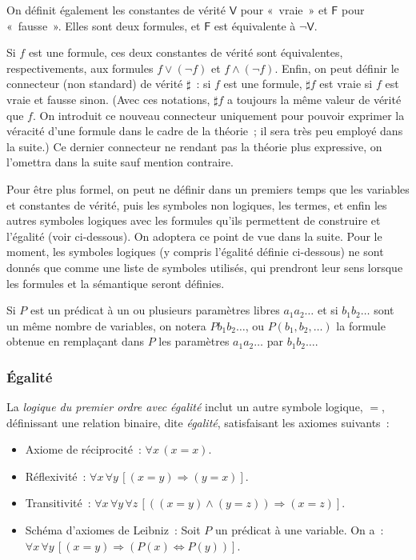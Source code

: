 On définit également les constantes de vérité $\mathsf{V}$ pour « vraie » et $\mathsf{F}$ pour « fausse ». 
Elles sont deux formules, et $\mathsf{F}$ est équivalente à $\neg \mathsf{V}$.

Si $f$ est une formule, ces deux constantes de vérité sont équivalentes, respectivements, aux formules $f \vee (\neg f)$ et $f \wedge (\neg f)$. 
Enfin, on peut définir le connecteur (non standard) de vérité $\sharp$ : si $f$ est une formule, $\sharp f$ est vraie si $f$ est vraie et fausse sinon.\sindex[isy]{$\sharp$} 
(Avec ces notations, $\sharp f$ a toujours la même valeur de vérité que $f$. 
On introduit ce nouveau connecteur uniquement pour pouvoir exprimer la véracité d'une formule dans le cadre de la théorie ; il sera très peu employé dans la suite.)
Ce dernier connecteur ne rendant pas la théorie plus expressive, on l'omettra dans la suite sauf mention contraire.

Pour être plus formel, on peut ne définir dans un premiers temps que les variables et constantes de vérité, puis les symboles non logiques, les termes, et enfin les autres symboles logiques avec les formules qu'ils permettent de construire et l'égalité (voir ci-dessous). 
On adoptera ce point de vue dans la suite. 
Pour le moment, les symboles logiques (y compris l'égalité définie ci-dessous) ne sont donnés que comme une liste de symboles utilisés, qui prendront leur sens lorsque les formules et la sémantique seront définies.

Si $P$ est un prédicat à un ou plusieurs paramètres libres $a_1 a_2 \dots$ et si $b_1 b_2 \dots$ sont un même nombre de variables, on notera $P b_1 b_2 \dots$, ou $P(b_1, b_2, \dots)$ la formule obtenue en remplaçant dans $P$ les paramètres $a_1 a_2 \dots$ par $b_1 b_2 \dots$.

\subsubsection{Égalité} 

\sindex[isy]{$=$}
La \textit{logique du premier ordre avec égalité} inclut un autre symbole logique, $=$, définissant une relation binaire, dite \textit{égalité}, satisfaisant les axiomes suivants : 
\begin{itemize}
    \item Axiome de réciprocité : $\forall x \, (x = x)$. 
    \item Réflexivité : $\forall x \, \forall y \, [ (x=y) \Rightarrow (y=x) ]$.
    \item Transitivité : $\forall x \, \forall y \, \forall z \, [((x=y) \wedge (y=z)) \Rightarrow (x=z)]$.
    \item Schéma d'axiomes de Leibniz : Soit $P$ un prédicat à une variable. On a : $\forall x \, \forall y \, [ (x = y) \Rightarrow (P(x) \Leftrightarrow P(y))]$.
\end{itemize}

